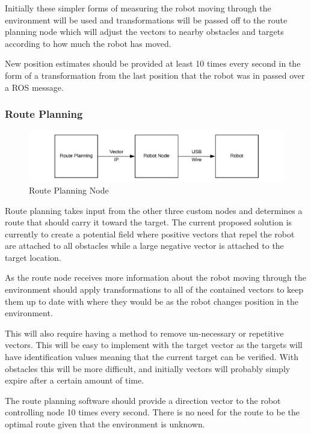 \documentclass{article}
\begin{document}
	Initially these simpler forms of measuring the robot moving through the environment will be used and transformations will be passed off to the route planning node which will adjust the vectors to nearby obstacles and targets according to how much the robot has moved. 
	
	New position estimates should be provided at least 10 times every second in the form of a transformation from the last position that the robot was in passed over a ROS message.

	\subsubsection{Route Planning}
	
	\begin{figure}[H]
		\centering
		\includegraphics[width=0.9\linewidth]{Route-Planning-Robot}
		\caption{Route Planning Node}
		\label{fig:routeplanning}
	\end{figure}

	Route planning takes input from the other three custom nodes and determines a route that should carry it toward the target. The current proposed solution is currently to create a potential field where positive vectors that repel the robot are attached to all obstacles while a large negative vector is attached to the target location.
	
	As the route node receives more information about the robot moving through the environment should apply transformations to all of the contained vectors to keep them up to date with where they would be as the robot changes position in the environment. 
	
	This will also require having a method to remove un-necessary or repetitive vectors. This will be easy to implement with the target vector as the targets will have identification values meaning that the current target can be verified. With obstacles this will be more difficult, and initially vectors will probably simply expire after a certain amount of time. 
	
	The route planning software should provide a direction vector to the robot controlling node 10 times every second. There is no need for the route to be the optimal route given that the environment is unknown.
\end{document}
